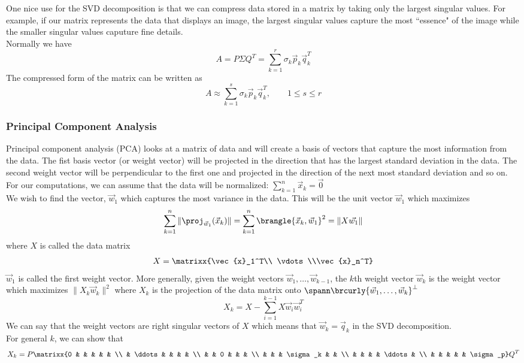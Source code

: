 One nice use for the SVD decomposition is that we can compress data stored in a matrix by taking only the largest singular values. For example, if our matrix represents the data that displays an image, the largest singular values capture the most ``essence" of the image while the smaller singular values caputure fine details.\\
Normally we have
$$A=P\Sigma Q^T=\sum_{k=1}^r\sigma_k\vec{p}_k\vec{q}_k^T$$
The compressed form of the matrix can be written as
$$A\approx \sum_{k=1}^s\sigma_k\vec{p}_k\vec{q}_k^T,\quad\quad 1\leq s\leq r$$


\subsubsection{Principal Component Analysis}
Principal component analysis (PCA) looks at a matrix of data and will create a basis of vectors that capture the most information from the data. The fist basis vector (or weight vector) will be projected in the direction that has the largest standard deviation in the data. The second weight vector will be perpendicular to the first one and projected in the direction of the next most standard deviation and so on.\\
For our computations, we can assume that the data will be normalized: $\sum\limits_{k=1}^n\vec{x}_k=\vec{0}$\\
We wish to find the vector, $\vec{w}_1$ which captures the most variance in the data. This will be the unit vector $\vec{w}_1$ which maximizes
$$\sum_{k=1}^n\|\proj_{\vec{w}_1}(\vec{x}_k)\|=\sum_{k=1}^n\brangle{\vec{x}_k,\vec{w}_1}^2=\|X\vec{w_1}\|$$
where $X$ is called the data matrix
$$X=\matrixx{\vec{x}_1^T\\ \vdots\\\vec{x}_n^T}$$
$\vec{w}_1$ is called the first weight vector. More generally, given the weight vectors $\vec{w}_1,\ldots,\vec{w}_{k-1}$, the $k$th weight vector $\vec{w}_k$ is the weight vector which maximizes $\|X_k\vec{w}_k\|^2$ where $X_k$ is the projection of the data matrix onto $\spann\brcurly{\vec{w}_1,\ldots,\vec{w}_k}^\perp$
$$X_k=X-\sum_{i=1}^{k-1}X\vec{w}_i\vec{w}_i^T$$
We can say that the weight vectors are right singular vectors of $X$ which means that $\vec{w}_k=\vec{q}_k$ in the SVD decomposition.\\
For general $k$, we can show that
$$X_k=P\matrixx{0 & & & & & \\ & \ddots & & & & \\ & & 0 & & & \\ & & & \sigma_k & & \\ & & & & \ddots & \\ & & & & & \sigma_p}Q^T$$
